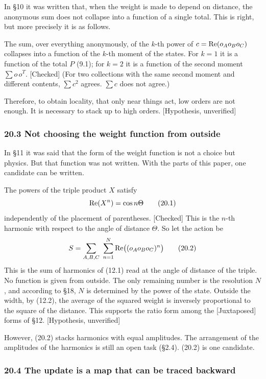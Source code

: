 \documentclass[
  a4paper,
]{article}
\begin{document}
In §10 it was written that, when the weight is made to depend on
distance, the anonymous sum does not collapse into a function of a
single total. This is right, but more precisely it is as follows.

The sum, over everything anonymously, of the \(k\)-th power of
\(c = {\rm Re}(o_Ao_Bo_C)\) collapses into a function of the \(k\)-th
moment of the states. For \(k = 1\) it is a function of the total \(P\)
(9.1); for \(k = 2\) it is a function of the second moment
\(\sum o\,o^T\). {[}Checked{]} (For two collections with the same second
moment and different contents, \(\sum c^2\) agrees. \(\sum c\) does not
agree.)

Therefore, to obtain locality, that only near things act, low orders are
not enough. It is necessary to stack up to high orders. {[}Hypothesis,
unverified{]}

\subsubsection{20.3 Not choosing the weight function from
outside}\label{not-choosing-the-weight-function-from-outside}

In §11 it was said that the form of the weight function is not a choice
but physics. But that function was not written. With the parts of this
paper, one candidate can be written.

The powers of the triple product \(X\) satisfy \[
{\rm Re}(X^n) = \cos n\Theta \tag{20.1}
\] independently of the placement of parentheses. {[}Checked{]} This is
the \(n\)-th harmonic with respect to the angle of distance \(\Theta\).
So let the action be \[
S = \sum_{A,B,C}\ \sum_{n=1}^{N}{\rm Re}\big((o_Ao_Bo_C)^n\big) \tag{20.2}
\] This is the sum of harmonics of (12.1) read at the angle of distance
of the triple. No function is given from outside. The only remaining
number is the resolution \(N\), and according to §18, \(N\) is
determined by the power of the state. Outside the width, by (12.2), the
average of the squared weight is inversely proportional to the square of
the distance. This supports the ratio form among the {[}Juxtaposed{]}
forms of §12. {[}Hypothesis, unverified{]}

However, (20.2) stacks harmonics with equal amplitudes. The arrangement
of the amplitudes of the harmonics is still an open task (§2.4). (20.2)
is one candidate.

\subsubsection{20.4 The update is a map that can be traced
backward}\label{the-update-is-a-map-that-can-be-traced-backward}
\end{document}
